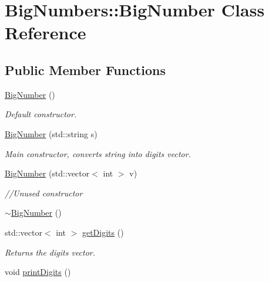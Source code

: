 \hypertarget{class_big_numbers_1_1_big_number}{}\section{Big\+Numbers\+::Big\+Number Class Reference}
\label{class_big_numbers_1_1_big_number}
\subsection*{Public Member Functions}
\begin{DoxyCompactItemize}
\item 
\mbox{\hyperlink{class_big_numbers_1_1_big_number_a5b76e86039ae97f38be80d5a0c04d2df}{Big\+Number}} ()
\begin{DoxyCompactList}\small\item\em Default constructor. \end{DoxyCompactList}\item 
\mbox{\hyperlink{class_big_numbers_1_1_big_number_a363386cd7d37e5955bb5ff84fb94828d}{Big\+Number}} (std\+::string s)
\begin{DoxyCompactList}\small\item\em Main constructor, converts string into digits vector. \end{DoxyCompactList}\item 
\mbox{\label{class_big_numbers_1_1_big_number_aefb0c5f69d1ca0c25b6b031650aa8358}} 
\mbox{\hyperlink{class_big_numbers_1_1_big_number_aefb0c5f69d1ca0c25b6b031650aa8358}{Big\+Number}} (std\+::vector$<$ int $>$ v)
\begin{DoxyCompactList}\small\item\em //\+Unused constructor \end{DoxyCompactList}\item 
\mbox{\hyperlink{class_big_numbers_1_1_big_number_a9e8e8cc609eb94cdd523064d220753ec}{$\sim$\+Big\+Number}} ()
\item 
std\+::vector$<$ int $>$ \mbox{\hyperlink{class_big_numbers_1_1_big_number_af54ae86c6d3cdb2591c3afa39af0a910}{get\+Digits}} ()
\begin{DoxyCompactList}\small\item\em Returns the digits vector. \end{DoxyCompactList}\item 
void \mbox{\hyperlink{class_big_numbers_1_1_big_number_ab9ad68382d05302b84a8109cb9ec4c9f}{print\+Digits}} ()

\end{DoxyCompactItemize}
